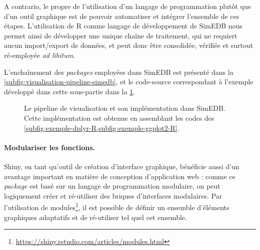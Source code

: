 A contrario, le propre de l'utilisation d'un langage de programmation plutôt que d'un outil graphique est de pouvoir automatiser et intégrer l'ensemble de ces étapes.
L'utilisation de \textsf{R} comme langage de développement de SimEDB nous permet ainsi de développer une unique chaîne de traitement, qui ne requiert aucun import/export de données, et peut donc être consolidée, vérifiée et surtout ré-employée \textit{ad libitum}.

L'enchaînement des \textit{packages} employées dans SimEDB est présenté dans la \cref{subfig:visualisation-pipeline-simedb}, et le code-source correspondant à l'exemple développé dans cette sous-partie dans la \cref{fig:visualisation-pipeline-exemple}.

\begin{figure}[H]
	\centering
	\hspace{5pt}
	\caption{Le \og pipeline\fg{} de visualisation et son implémentation dans SimEDB. Cette implémentation est obtenue en assemblant les codes des \cref{subfig:exemple-dplyr-R,subfig:exemple-ggplot2-R}.}
	\label{fig:visualisation-pipeline-exemple}
\end{figure}

\paragraph{Modulariser les fonctions.}

\textsf{Shiny}, en tant qu'outil de création d'interface graphique, bénéficie aussi d'un avantage important en matière de conception d'application web : comme ce \textit{package} est basé sur un langage de programmation modulaire, on peut logiquement créer et ré-utiliser des \og briques d'interfaces\fg{} modulaires.
Par l'utilisation de modules\footnote{\href{https://shiny.rstudio.com/articles/modules.html}{https://shiny.rstudio.com/articles/modules.html}}, il est possible de définir un ensemble d'éléments graphiques adaptatifs et de ré-utiliser tel quel cet ensemble.

